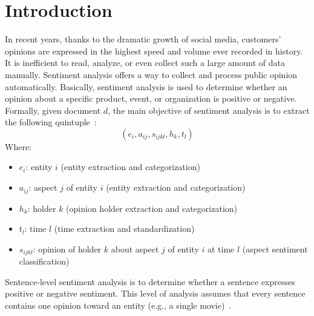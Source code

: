 \section{Introduction}
In recent years, thanks to the dramatic growth of social media, customers' opinions are expressed in the highest speed and volume ever recorded in history.
It is inefficient to read, analyze, or even collect such a large amount of data manually.
Sentiment analysis offers a way to collect and process public opinion automatically.
Basically, sentiment analysis is used to determine whether an opinion about a specific product, event, or organization is positive or negative.
Formally, given document $d$, the main objective of sentiment analysis is to extract the following quintuple~\cite{liu2012sentiment}:
\[ ( e_{i}, a_{ij}, s_{ijkl}, h_{k}, t_{l} ) \]
Where:
\begin{itemize}
	\item $e_{i}$: entity \(i\) (entity extraction and categorization)
	\item $a_{ij}$: aspect \(j\) of entity \(i\) (entity extraction and categorization)
	\item $h_{k}$: holder \(k\) (opinion holder extraction and categorization)
	\item $t_{l}$: time \(l\) (time extraction and standardization)
	\item $s_{ijkl}$: opinion of holder \(k\) about aspect \(j\) of entity \(i\) at time \(l\) (aspect sentiment classification)
\end{itemize}
Sentence-level sentiment analysis is to determine whether a sentence expresses positive or negative sentiment.
This level of analysis assumes that every sentence contains one opinion toward an entity (e.g., a single movie)~\cite{liu2012sentiment}.

